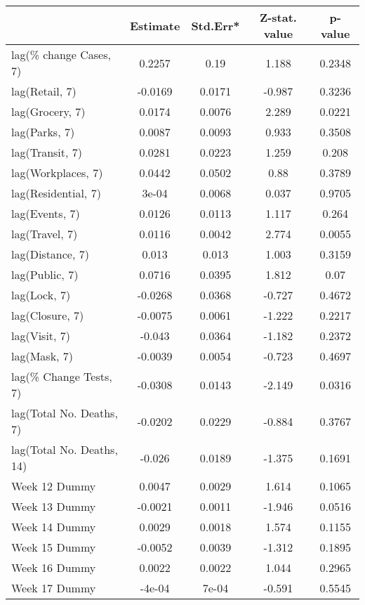 \begingroup\tiny
\begin{longtable}{lcccc}
  \toprule
 & Estimate & Std.Err* & Z-stat. value & p-value \\ 
  \midrule
lag(\% change Cases, 7) & 0.2257 & 0.19 & 1.188 & 0.2348 \\ 
  lag(Retail, 7) & -0.0169 & 0.0171 & -0.987 & 0.3236 \\ 
  lag(Grocery, 7) & 0.0174 & 0.0076 & 2.289 & 0.0221 \\ 
  lag(Parks, 7) & 0.0087 & 0.0093 & 0.933 & 0.3508 \\ 
  lag(Transit, 7) & 0.0281 & 0.0223 & 1.259 & 0.208 \\ 
  lag(Workplaces, 7) & 0.0442 & 0.0502 & 0.88 & 0.3789 \\ 
  lag(Residential, 7) & 3e-04 & 0.0068 & 0.037 & 0.9705 \\ 
  lag(Events, 7) & 0.0126 & 0.0113 & 1.117 & 0.264 \\ 
  lag(Travel, 7) & 0.0116 & 0.0042 & 2.774 & 0.0055 \\ 
  lag(Distance, 7) & 0.013 & 0.013 & 1.003 & 0.3159 \\ 
  lag(Public, 7) & 0.0716 & 0.0395 & 1.812 & 0.07 \\ 
  lag(Lock, 7) & -0.0268 & 0.0368 & -0.727 & 0.4672 \\ 
  lag(Closure, 7) & -0.0075 & 0.0061 & -1.222 & 0.2217 \\ 
  lag(Visit, 7) & -0.043 & 0.0364 & -1.182 & 0.2372 \\ 
  lag(Mask, 7) & -0.0039 & 0.0054 & -0.723 & 0.4697 \\ 
  lag(\% Change Tests, 7) & -0.0308 & 0.0143 & -2.149 & 0.0316 \\ 
  lag(Total No. Deaths, 7) & -0.0202 & 0.0229 & -0.884 & 0.3767 \\ 
  lag(Total No. Deaths, 14) & -0.026 & 0.0189 & -1.375 & 0.1691 \\ 
  Week 12 Dummy & 0.0047 & 0.0029 & 1.614 & 0.1065 \\ 
  Week 13 Dummy & -0.0021 & 0.0011 & -1.946 & 0.0516 \\ 
  Week 14 Dummy & 0.0029 & 0.0018 & 1.574 & 0.1155 \\ 
  Week 15 Dummy & -0.0052 & 0.0039 & -1.312 & 0.1895 \\ 
  Week 16 Dummy & 0.0022 & 0.0022 & 1.044 & 0.2965 \\ 
  Week 17 Dummy & -4e-04 & 7e-04 & -0.591 & 0.5545 \\ 

\end{longtable}
